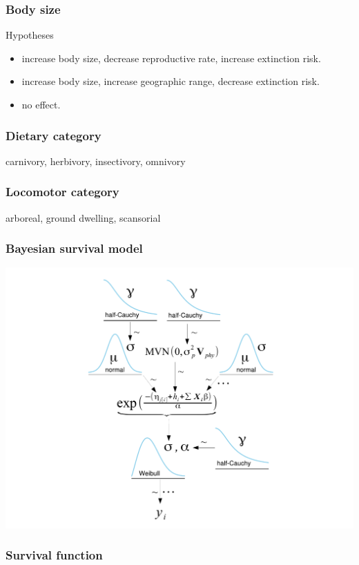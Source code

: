 \documentclass{beamer}
\begin{document}
\begin{frame}
  \frametitle{Body size}

  \begin{block}{Hypotheses}
    \begin{itemize}
      \item increase body size, decrease reproductive rate, increase extinction risk.
      \item increase body size, increase geographic range, decrease extinction risk.
      \item no effect.
    \end{itemize}
  \end{block}
\end{frame}

\begin{frame}
  \frametitle{Dietary category}

  carnivory, herbivory, insectivory, omnivory
\end{frame}

\begin{frame}
  \frametitle{Locomotor category}

  arboreal, ground dwelling, scansorial
\end{frame}


\begin{frame}
  \frametitle{Bayesian survival model}
  \includegraphics[width=\textwidth,height=0.8\textheight,keepaspectratio=true]{figure/mammal_survival_model}
\end{frame}

\begin{frame}
  \frametitle{Survival function}
\end{frame}
\end{document}
